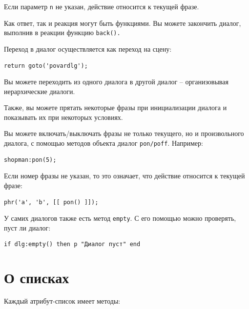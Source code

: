 \documentclass[12pt]{article}
\begin{document}
Если параметр \verb/n/ не указан, действие относится к текущей фразе.

Как ответ, так и реакция могут быть функциями. Вы можете закончить диалог, выполнив в реакции функцию \verb/back()./

Переход в диалог осуществляется как переход на сцену:

\begin{verbatim}
return goto('povardlg');
\end{verbatim}

Вы можете переходить из одного диалога в другой диалог -- организовывая иерархические диалоги.

Также, вы можете прятать некоторые фразы при инициализации диалога и показывать их при некоторых условиях.

Вы можете включать/выключать фразы не только текущего, но и произвольного диалога, с помощью методов объекта диалог \verb,pon/poff,. Например:

\begin{verbatim}
shopman:pon(5);
\end{verbatim}

Если номер фразы не указан, то это означает, что действие относится к текущей фразе:

\begin{verbatim}
phr('a', 'b', [[ pon() ]]);
\end{verbatim}

У самих диалогов также есть метод \verb/empty/. С его помощью можно проверять, пуст ли диалог:

\begin{verbatim}
if dlg:empty() then p "Диалог пуст" end
\end{verbatim}

\section{О списках}

Каждый атрибут-список имеет методы:
\end{document}
